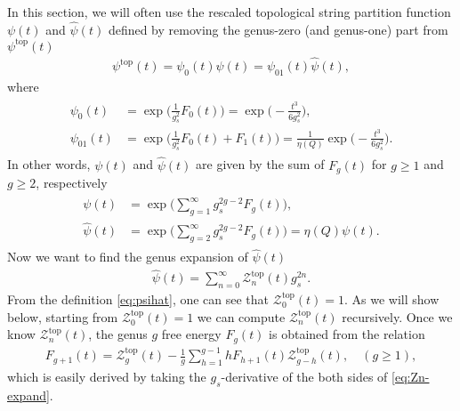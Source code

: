 \documentclass[11pt]{article}
\def\h#1{\widehat{#1}}
\newcommand{\Ztop}{\mathcal{Z}^{\text{top}}}
\renewcommand{\[}{\begin{eqnarray}}
\renewcommand{\]}{\end{eqnarray}}
\begin{document}
In this section, we will often use the
rescaled topological string partition function
$\psi(t)$ and $\h{\psi}(t)$ defined by  
removing the genus-zero (and genus-one) part from $\psi^{\text{top}}(t)$
\begin{align}
 \psi^{\text{top}}(t)=\psi_0(t)\psi(t)
=\psi_{01}(t)\h{\psi}(t),
\label{eq:psi01}
\end{align}
where
\begin{align}
 \begin{aligned}
  \psi_0(t)&=\exp\Biggl(\frac{1}{g_s^2}F_0(t)\Biggr)=\exp\Biggl(-\frac{t^3}{6g_s^2}\Biggr),\\
 \psi_{01}(t)&=\exp\Biggl(\frac{1}{g_s^2}F_0(t)+F_1(t)\Biggr)
 =\frac{1}{\eta(Q)}\exp\Biggl(-\frac{t^3}{6g_s^2}\Biggr).  
 \end{aligned}
 \label{eq:def-psi01}
\end{align}
In other words,
$\psi(t)$ and $\h{\psi}(t)$ are given by
the sum of $F_g(t)$ for $g\geq1$ and $g\geq2$, respectively
\begin{align}
\begin{aligned}
 \psi(t)&=\exp\Biggl(\sum_{g=1}^\infty g_s^{2g-2}F_g(t)\Biggr),\\
\h{\psi}(t)&=\exp\Biggl(\sum_{g=2}^\infty g_s^{2g-2}F_g(t)\Biggr) =\eta(Q)\psi(t).
\label{eq:psihat}
\end{aligned}
\end{align}
Now we want to find the genus expansion of $\h{\psi}(t)$
\begin{align}
 \h{\psi}(t)=\sum_{n=0}^\infty \Ztop_n(t)g_s^{2n}.
\label{eq:Zn-expand}
\end{align}
From the definition \eqref{eq:psihat}, 
one can  see that  $\Ztop_0(t)=1$.
As we will show below, starting from $\Ztop_0(t)=1$
we can compute $\Ztop_n(t)$ recursively.
Once we know $\Ztop_n(t)$, the genus $g$ free energy 
$F_{g}(t)$ is  obtained 
from the relation
\begin{align}
 F_{g+1}(t)=\Ztop_g(t)-\frac{1}{g}\sum_{h=1}^{g-1}hF_{h+1}(t)\Ztop_{g-h}(t),\quad(g\geq1),
\label{eq:ZtoF}
\end{align}
which is easily derived by taking the $g_s$-derivative of the both sides of
\eqref{eq:Zn-expand}.
\end{document}
